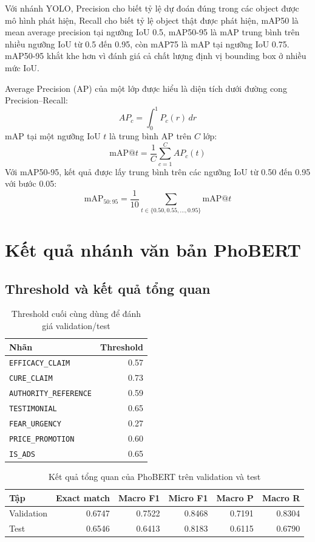 Với nhánh YOLO, Precision cho biết tỷ lệ dự đoán đúng trong các object được mô hình phát hiện, Recall cho biết tỷ lệ object thật được phát hiện, mAP50 là mean average precision tại ngưỡng IoU 0.5, mAP50-95 là mAP trung bình trên nhiều ngưỡng IoU từ 0.5 đến 0.95, còn mAP75 là mAP tại ngưỡng IoU 0.75. mAP50-95 khắt khe hơn vì đánh giá cả chất lượng định vị bounding box ở nhiều mức IoU.

Average Precision (AP) của một lớp được hiểu là diện tích dưới đường cong Precision--Recall:
\[
AP_c = \int_{0}^{1} P_c(r)\,dr
\]
mAP tại một ngưỡng IoU \(t\) là trung bình AP trên \(C\) lớp:
\[
\mathrm{mAP}@t = \frac{1}{C}\sum_{c=1}^{C} AP_c(t)
\]
Với mAP50-95, kết quả được lấy trung bình trên các ngưỡng IoU từ 0.50 đến 0.95 với bước 0.05:
\[
\mathrm{mAP}_{50:95}
= \frac{1}{10}\sum_{t \in \{0.50,0.55,\ldots,0.95\}}
\mathrm{mAP}@t
\]

\section{Kết quả nhánh văn bản PhoBERT}
\subsection{Threshold và kết quả tổng quan}
\begin{table}[H]
\centering
\caption{Threshold cuối cùng dùng để đánh giá validation/test}
\label{tab:phobert_thresholds}
\begin{tabular}{|l|r|}
\hline
\textbf{Nhãn} & \textbf{Threshold} \\
\hline
\texttt{EFFICACY\_CLAIM} & 0.57 \\ \hline
\texttt{CURE\_CLAIM} & 0.73 \\ \hline
\texttt{AUTHORITY\_REFERENCE} & 0.59 \\ \hline
\texttt{TESTIMONIAL} & 0.65 \\ \hline
\texttt{FEAR\_URGENCY} & 0.27 \\ \hline
\texttt{PRICE\_PROMOTION} & 0.60 \\ \hline
\texttt{IS\_ADS} & 0.65 \\ \hline
\end{tabular}
\end{table}

\begin{table}[H]
\centering
\caption{Kết quả tổng quan của PhoBERT trên validation và test}
\label{tab:phobert_overall_results}
\begin{tabular}{|l|r|r|r|r|r|}
\hline
\textbf{Tập} & \textbf{Exact match} & \textbf{Macro F1} & \textbf{Micro F1} & \textbf{Macro P} & \textbf{Macro R} \\
\hline
Validation & 0.6747 & 0.7522 & 0.8468 & 0.7191 & 0.8304 \\ \hline
Test & 0.6546 & 0.6413 & 0.8183 & 0.6115 & 0.6790 \\ \hline
\end{tabular}
\end{table}


